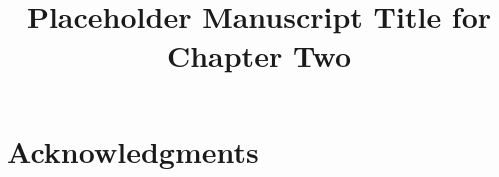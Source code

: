 \documentclass[../main.tex]{subfiles}
\title{Placeholder Manuscript Title for Chapter Two}
\affil{a}{Your Institute, Your Department, Your University, City, Country}
\begin{document}
\manuscriptfront






\section*{Acknowledgments}


\end{document}
